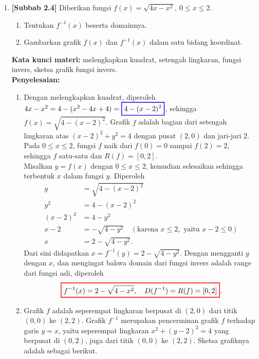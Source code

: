 \documentclass[10pt,openany,a4paper]{article}
\theoremstyle{definition}
\theoremstyle{definition}
\theoremstyle{plain}
\newenvironment{jawab}[2][tes]{%
\par\noindent\textbf{Kata kunci materi:} #1.\\
\textbf{Penyelesaian:} #2%
}{}
\begin{document}
\begin{enumerate}
    \item \textbf{[Subbab 2.4]} Diberikan fungsi $f(x)=\sqrt{4x-x^2},\ 0\leq x\leq 2$.
    \begin{enumerate}
        \item Tentukan $f^{-1}(x)$ beserta domainnya.
        \item Gambarkan grafik $f(x)$ dan $f^{-1}(x)$ dalam satu bidang koordinat.
    \end{enumerate}
    \begin{jawab}[melengkapkan kuadrat, setengah lingkaran, fungsi invers, sketsa grafik fungsi invers]{
        \begin{enumerate}
            \item Dengan melengkapkan kuadrat, diperoleh $4x-x^2 = 4-(x^2-4x+4) = \colorlet{oldcolor}{.}
        \color{blue}
        \setlength{\fboxrule}{1pt} \boxed{\color{oldcolor}4-(x-2)^2}\color{oldcolor}$, sehingga $f(x)=\sqrt{4-(x-2)^2}$. Grafik $f$ adalah bagian dari setengah lingkaran atas $(x-2)^2+y^2=4$ dengan pusat $(2,0)$ dan jari-jari $2$. Pada $0\leq x\leq 2$, fungsi $f$ naik dari $f(0)=0$ sampai $f(2)=2$, sehingga $f$ satu-satu dan $R(f)=[0,2]$.\\
            Misalkan $y=f(x)$ dengan $0\leq x\leq 2$, kemudian selesaikan sehingga terbentuk $x$ dalam fungsi $y$. Diperoleh
            \begin{align*}
                y &= \sqrt{4-(x-2)^2}\\
                y^2 &= 4-(x-2)^2\\
                (x-2)^2 &= 4-y^2\\
                x-2 &= -\sqrt{4-y^2} \quad (\text{karena } x\leq 2, \text{ yaitu } x-2\leq 0)\\
                x &= 2-\sqrt{4-y^2}.
            \end{align*}
            Dari sini didapatkan $x = f^{-1}(y) = 2-\sqrt{4-y^2}$. Dengan mengganti $y$ dengan $x$, dan mengingat bahwa domain dari fungsi invers adalah range dari fungsi asli, diperoleh
            \begin{align*}
                \colorlet{oldcolor}{.}
        \color{red}
        \setlength{\fboxrule}{1pt} \boxed{\color{oldcolor}f^{-1}(x) = 2-\sqrt{4-x^2},\quad D(f^{-1})=R(f)=[0,2]}\color{oldcolor}.
            \end{align*}
            \item Grafik $f$ adalah seperempat lingkaran berpusat di $(2,0)$ dari titik $(0,0)$ ke $(2,2)$. Grafik $f^{-1}$ merupakan pencerminan grafik $f$ terhadap garis $y=x$, yaitu seperempat lingkaran $x^2+(y-2)^2=4$ yang berpusat di $(0,2)$, juga dari titik $(0,0)$ ke $(2,2)$. Sketsa grafiknya adalah sebagai berikut.

\end{enumerate}}
\end{jawab}
\end{enumerate}
\end{document}
